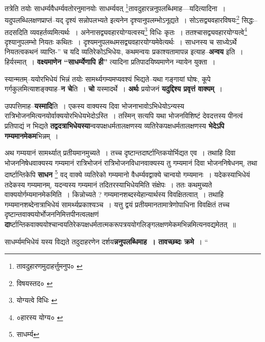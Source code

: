 \documentclass[article,12pt,a4paper]{memoir}
\begin{document}
	तत्रेति तयोः साधर्म्यवैधर्म्यवतोरनुमानयोः साधर्म्यवत् \footnote{तावदुहारणमुदाहर्त्तुमनुप० \cite{dp-msC} \cite{dp-msB}}\-तावदुहारन्ननुपलब्धिमाह—यदित्यादिना । यदुपलब्धिलक्षणप्राप्तं--यद् दृश्यं सन्नोपलभ्यते इत्यनेन दृश्यानुपलम्भोऽनूद्यते । सोऽसद्व्यवहारविषयः\footnote{विषयस्तद० \cite{dp-msB} \cite{dp-msC} \cite{dp-msD}} सिद्धः--तदसदिति व्यवहर्तव्यमित्यर्थः । अनेनासद्व्यवहारयोग्यत्वस्य\footnote{योग्यत्वे विधिः \cite{dp-msB}} विधिः कृतः । ततश्चासद्व्यवहारयोग्यत्वे\footnote{०हारस्य योग्य० \cite{dp-msA} \cite{dp-msB} \cite{dp-edP} \cite{dp-edH} \cite{dp-edE} \cite{dp-edN}} दृश्यानुपलम्भो नियतः कथितः । दृश्यमनुपलब्धमसद्व्यवहारयोग्यमेवेत्यर्थः । साधनस्य च साध्येऽर्थे नियतत्वकथनं व्याप्ति-” च यदि व्यतिरेकोऽभिधेयः, कथमन्वयः प्रकाश्यतामापन्न इत्याह--\textbf{अन्वय} इति । हिर्यस्मात् । \textbf{वक्ष्यमाणेन “साधर्म्येणापि ही”} त्यादिना प्रतिपादयिष्यमाणेन न्यायेन युक्ता ।
	\pend
      

	  \pstart स्यान्मतम्--ययोरभिधेयं भिन्नं तयोः सामर्थ्यगम्यमप्यवश्यं भिद्यते--यथा गङ्गायां घोषः, कूपे गर्गकुलमित्याशङ्क्याह--\textbf{न चे}ति । \textbf{चो} यस्मादर्थे । \textbf{अर्थः} प्रयोजनं \textbf{यदुद्दिश्य प्रवृत्तं वाक्यम्} ।
	\pend
      

	  \pstart उपपत्तिमाह--\textbf{यस्मादि}ति । एकस्य वाक्यस्य दिवा भोजनाभावोऽभिधेयोऽन्यस्य रात्रिभोजनमित्यनयोर्वाक्य\leavevmode{}योरभिधेयभेदोऽस्ति । तस्मिन् सत्यपि यथा भोजनविशिष्टं देवदत्तस्य पीनत्वं प्रतिपाद्यं न भिद्यते \textbf{तद्वदत्राभिधेयस्या}न्वयपक्षधर्मतालक्षणस्य व्यतिरेकपक्षधर्मतालक्षणस्य \textbf{भेदेऽपि गम्यमानमेकम}भिन्नम् ।
	\pend
      

	  \pstart अथ गम्ययानं सामर्थ्यात् प्रतीयमानमुच्यते । तच्च दृष्टान्तदार्ष्टान्तिकयोर्भिद्यत एव । तथाहि दिवा भोजननिषेधवाक्यस्य गम्यमानं रात्रिभोजनं रात्रिभोजनविधानवाक्यस्य तु गम्यमानं दिवा भोजननिषेधनम्, तथा दार्ष्टान्तिकेपि \textbf{साधन} \footnote{साधर्म्य} वद् वाक्ये व्यतिरेको गम्यमानो वैधर्म्यवद्वाक्ये चान्वयो गम्यमानः । यदेकस्याभिधेयं तदेकस्य गम्यमानम्, यदन्यस्य गम्यमानं तदितरस्याभिधेयमिति संक्षेपः । ततः कथमुच्यते वाक्ययोर्गम्यमानमेकमिति । किन्नोच्यते ? गम्यमानशब्दस्येहान्यार्थस्य विवक्षितत्वात् । तथाहि गम्यमानशब्देनात्राभिधेयं सामर्थ्यप्रकाश्यञ्च । यत्तु द्वयं प्रतीयमानतामात्रेणोपाधिना विवक्षितं तच्च दृष्टान्तवाक्ययोर्भोजननिमित्तपीनत्वलक्षणं \textbf{दा}र्ष्टान्तिकवाक्ययोश्चान्वयतिरेकपक्षधर्मतात्मकरूपत्रययोगलिङ्गलक्षणमेकमभिन्नमित्यनवद्यमेतत् ॥
	\pend
      

	  \pstart साधर्म्यमभिधेयं यस्य विद्यते तदुदाहरणेन दर्शय\textbf{न्ननुपलब्धिमाह । तावच्छब्दः क्रमे} ।  \leavevmode{} “
	  
\end{document}
